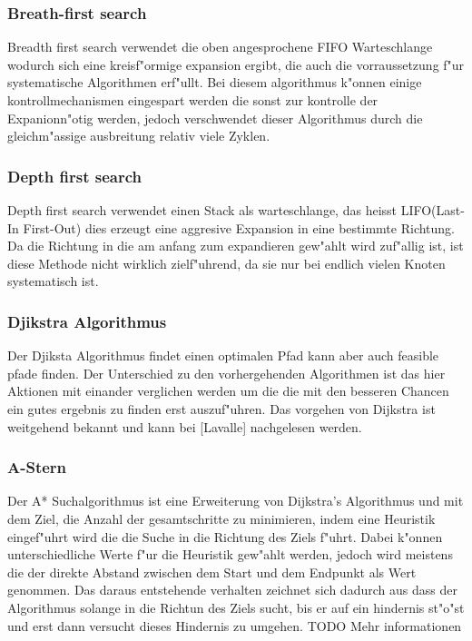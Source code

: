 \subsubsection{Breath-first search} Breadth first search verwendet die oben angesprochene FIFO Warteschlange wodurch sich eine kreisf"ormige expansion ergibt, die auch die vorraussetzung f"ur systematische Algorithmen erf"ullt. Bei diesem algorithmus k"onnen einige kontrollmechanismen eingespart werden die sonst zur kontrolle der Expanionn"otig werden, jedoch verschwendet dieser Algorithmus durch die gleichm"assige ausbreitung relativ viele Zyklen. 
\newline
\newline
\subsubsection{Depth first search} Depth first search verwendet einen Stack als warteschlange, das heisst LIFO(Last-In First-Out) dies erzeugt eine aggresive Expansion in eine bestimmte Richtung.
Da die Richtung in die am anfang zum expandieren gew"ahlt wird zuf"allig ist, ist diese Methode nicht wirklich zielf"uhrend, da sie nur bei endlich vielen Knoten systematisch ist. 
\subsubsection{Djikstra Algorithmus}
Der Djiksta Algorithmus findet einen optimalen Pfad kann aber auch feasible pfade finden. Der Unterschied zu den vorhergehenden Algorithmen ist das hier Aktionen mit einander verglichen werden um die die mit den besseren Chancen ein gutes ergebnis zu finden erst auszuf"uhren. Das vorgehen von Dijkstra ist weitgehend bekannt und kann bei [Lavalle] nachgelesen werden.

\subsubsection{A-Stern} 
Der A* Suchalgorithmus ist eine Erweiterung von Dijkstra's Algorithmus und mit dem Ziel, die Anzahl der gesamtschritte zu minimieren,
indem eine Heuristik eingef"uhrt wird die die Suche in die Richtung des Ziels f"uhrt. Dabei k"onnen unterschiedliche Werte f"ur die Heuristik gew"ahlt werden,
jedoch wird meistens die der direkte Abstand zwischen dem Start und dem Endpunkt als Wert genommen. Das daraus entstehende verhalten zeichnet sich dadurch aus dass der Algorithmus solange in die Richtun des Ziels sucht, bis er auf ein hindernis st"o"st und erst dann versucht dieses Hindernis zu umgehen.
\newline
TODO Mehr informationen

